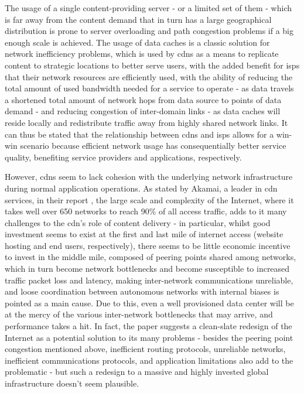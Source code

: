     The usage of a single content-providing server - or a limited set of them - which is far away from the content demand that in turn has a large geographical distribution is prone to server overloading and path congestion problems if a big enough scale is achieved.
    The usage of data caches is a classic solution for network inefficiency problems, which is used by \glspl{cdn} as a means to replicate content to strategic locations to better serve users, with the added benefit for \glspl{isp} that their network resources are efficiently used, with the ability of reducing the total amount of used bandwidth needed for a service to operate - as data travels a shortened total amount of network hops from data source to points of data demand - and reducing congestion of inter-domain links - as data caches will reside locally and redistribute traffic away from highly shared network links.
    It can thus be stated that the relationship between \glspl{cdn} and \glspl{isp} allows for a win-win scenario because efficient network usage has consequentially better service quality, benefiting service providers and applications, respectively.

    However, \glspl{cdn} seem to lack cohesion with the underlying network infrastructure during normal application operations.
    As stated by Akamai, a leader in \gls{cdn} services, in their report \cite{akamai-report}, the large scale and complexity of the Internet, where it takes well over 650 networks to reach 90\% of all access traffic, adds to it many challenges to the \gls{cdn}'s role of content delivery - in particular, whilst good investment seems to exist at the first and last mile of internet access (website hosting and end users, respectively), there seems to be little economic incentive to invest in the middle mile, composed of peering points shared among networks, which in turn become network bottlenecks and become susceptible to increased traffic packet loss and latency, making inter-network communications unreliable, and loose coordination between autonomous networks with internal biases is pointed as a main cause.
    Due to this, even a well provisioned data center will be at the mercy of the various inter-network bottlenecks that may arrive, and performance takes a hit.
    In fact, the paper suggests a clean-slate redesign of the Internet as a potential solution to its many problems - besides the peering point congestion mentioned above, inefficient routing protocols, unreliable networks, inefficient communications protocols, and application limitations also add to the problematic - but such a redesign to a massive and highly invested global infrastructure doesn't seem plausible.

